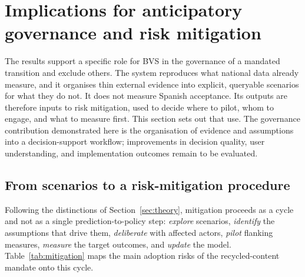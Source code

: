 \section{Implications for anticipatory governance and risk mitigation}
\label{sec:implications}

The results support a specific role for BVS in the governance of a mandated
transition and exclude others. The system reproduces what national data
already measure, and it organises thin external evidence into explicit,
queryable scenarios for what they do not. It does not measure Spanish
acceptance. Its outputs are therefore inputs to risk mitigation, used to
decide where to pilot, whom to engage, and what to measure first. This section
sets out that use. The governance contribution demonstrated here is the
organisation of evidence and assumptions into a decision-support workflow;
improvements in decision quality, user understanding, and implementation
outcomes remain to be evaluated.

\subsection{From scenarios to a risk-mitigation procedure}

Following the distinctions of Section~\ref{sec:theory}, mitigation proceeds as
a cycle and not as a single prediction-to-policy step:
\emph{explore} scenarios, \emph{identify} the assumptions that drive them,
\emph{deliberate} with affected actors, \emph{pilot} flanking measures,
\emph{measure} the target outcomes, and \emph{update} the model.
Table~\ref{tab:mitigation} maps the main adoption risks of the
recycled-content mandate onto this cycle.

